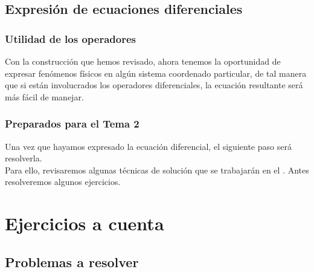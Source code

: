 \documentclass[12pt]{beamer}
\begin{document}
\subsection{Expresión de ecuaciones diferenciales}

\begin{frame}
\frametitle{Utilidad de los operadores}
Con la construcción que hemos revisado, ahora tenemos la oportunidad de expresar fenómenos físicos en algún sistema coordenado particular, de tal manera que si están involucrados los operadores diferenciales, la ecuación resultante será más fácil de manejar.
\end{frame}
\begin{frame}
\frametitle{Preparados para el Tema 2}
Una vez que hayamos expresado la ecuación diferencial, el siguiente paso será resolverla.
\\
\bigskip
\pause
Para ello, revisaremos algunas técnicas de solución que se trabajarán en el \emph{}. Antes resolveremos algunos ejercicios.
\end{frame}

\section{Ejercicios a cuenta}
\subsection{Problemas a resolver}
\end{document}
